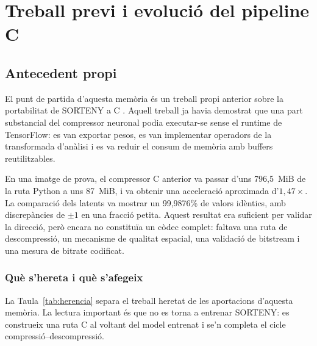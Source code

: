 \chapter{Treball previ i evolució del pipeline C}\label{ch:pipeline}
\fancyhead[LO]{\slshape \textsf{\nouppercase \rightmark}}

\section{Antecedent propi}\label{sec:antecedent}

El punt de partida d'aquesta memòria és un treball propi anterior sobre la
portabilitat de SORTENY a C \cite{anez2026treball}. Aquell treball ja havia
demostrat que una part substancial del compressor neuronal podia executar-se
sense el runtime de TensorFlow: es van exportar pesos, es van implementar
operadors de la transformada d'anàlisi i es va reduir el consum de memòria amb
buffers reutilitzables.

En una imatge de prova, el compressor C anterior va passar d'uns 796,5~MiB de
la ruta Python a uns 87~MiB, i va obtenir una acceleració aproximada
d'$1,47\times$. La comparació dels latents va mostrar un 99,9876\% de valors
idèntics, amb discrepàncies de $\pm1$ en una fracció petita. Aquest resultat
era suficient per validar la direcció, però encara no constituïa un còdec
complet: faltava una ruta de descompressió, un mecanisme de qualitat espacial,
una validació de bitstream i una mesura de bitrate codificat.

\subsection{Què s'hereta i què s'afegeix}

La Taula~\ref{tab:herencia} separa el treball heretat de les aportacions
d'aquesta memòria. La lectura important és que no es torna a entrenar SORTENY:
es construeix una ruta C al voltant del model entrenat i se'n completa el cicle
compressió--descompressió.

